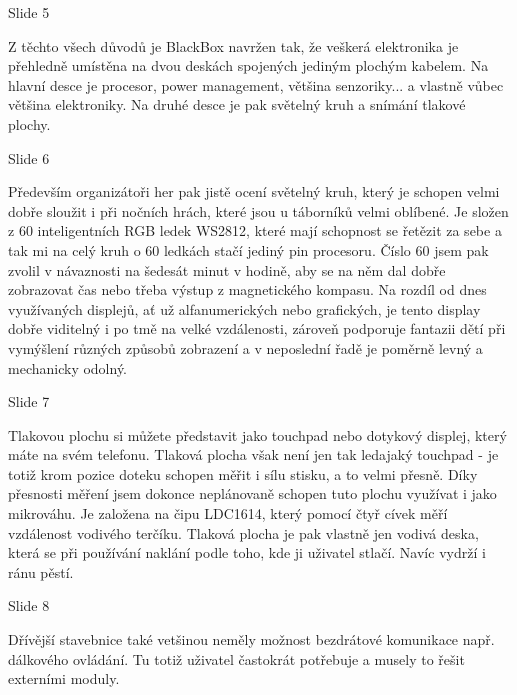 
Slide 5 

Z těchto všech důvodů je BlackBox navržen tak, že  %
veškerá elektronika je přehledně umístěna na dvou deskách spojených jediným plochým kabelem.
Na hlavní desce je procesor, power management, většina
senzoriky... a vlastně vůbec většina elektroniky. Na druhé desce je pak světelný kruh
 a snímání tlakové plochy.
 
Slide 6

Především organizátoři her pak jistě ocení světelný kruh, který je schopen velmi dobře sloužit 
i při nočních hrách, které jsou u táborníků velmi oblíbené.
Je složen z 60 inteligentních RGB ledek WS2812, které mají schopnost se řetězit za sebe 
a tak mi na celý kruh o 60 ledkách stačí jediný pin procesoru. 
Číslo 60 jsem pak zvolil v návaznosti na šedesát minut v hodině, 
aby se na něm dal dobře zobrazovat čas nebo třeba výstup z magnetického kompasu. 
Na rozdíl od dnes využívaných displejů, ať už alfanumerických nebo grafických, 
je tento display dobře viditelný i po tmě na velké vzdálenosti, 
zároveň podporuje fantazii dětí při vymýšlení různých způsobů zobrazení 
a v neposlední řadě je poměrně levný a mechanicky odolný. 


Slide 7

Tlakovou plochu si můžete představit jako touchpad nebo dotykový displej, který máte na svém telefonu.
Tlaková plocha však není jen tak ledajaký touchpad -  je totiž krom pozice doteku 
schopen měřit i sílu stisku, a to velmi přesně.
Díky přesnosti měření jsem dokonce neplánovaně schopen tuto plochu využívat i jako mikrováhu. 
Je založena na čipu LDC1614, který
pomocí čtyř cívek měří vzdálenost vodivého terčíku. Tlaková plocha je pak vlastně 
jen vodivá deska, která se při používání naklání podle toho, kde ji uživatel stlačí.
Navíc vydrží i ránu pěstí.   

Slide 8

Dřívější stavebnice také vetšinou neměly možnost bezdrátové komunikace např. dálkového ovládání.
Tu totiž uživatel častokrát potřebuje a musely to řešit externími moduly.

